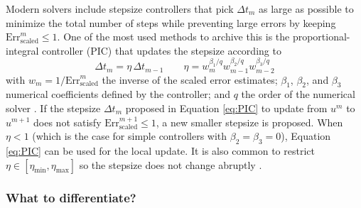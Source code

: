 Modern solvers include stepsize controllers that pick $\Delta t_m$ as large as possible to minimize the total number of steps while preventing large errors by keeping $\text{Err}^m_\text{scaled} \leq 1$. 
One of the most used methods to archive this is the proportional-integral controller (PIC) that updates the stepsize according to 
\begin{equation}
    \Delta t_{m} = \eta \, \Delta t_{m-1}
    \qquad 
    \eta = w_{m}^{\beta_1 / q} w_{m-1}^{\beta_2 / q} w_{m-2}^{\beta_3 / q}
    \label{eq:PIC}
\end{equation}
with $w_{m} = 1 / \text{Err}_\text{scaled}^{m}$ the inverse of the scaled error estimates; $\beta_1$, $\beta_2$, and $\beta_3$ numerical coefficients defined by the controller; and $q$ the order of the numerical solver \cite{hairer-solving-2, Ranocha_Dalcin_Parsani_Ketcheson_2022}. 
If the stepsize $\Delta t_{m}$ proposed in Equation \eqref{eq:PIC} to update from $u^{m}$ to $u^{m+1}$ does not satisfy $\text{Err}_\text{scaled}^{m+1} \leq 1$, a new smaller stepsize is proposed. 
When $\eta < 1$ (which is the case for simple controllers with $\beta_2 = \beta_3 = 0$), Equation \eqref{eq:PIC} can be used for the local update. 
It is also common to restrict $\eta \in [\eta_\text{min}, \eta_\text{max}]$ so the stepsize does not change abruptly \cite{hairer-solving-1}. 



\subsubsection{What to differentiate?}

